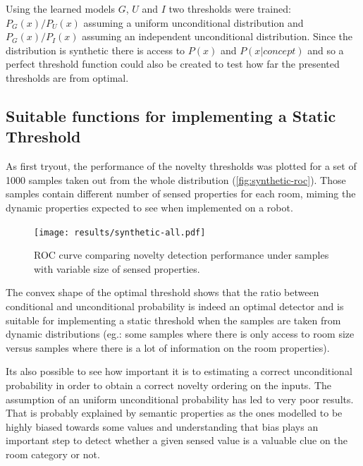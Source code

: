 \documentclass[runningheads,a4paper]{llncs}
\begin{document}
Using the learned models $G$, $U$ and $I$ two thresholds were trained:
$P_G(x)/P_U(x)$ assuming a uniform unconditional distribution
and $P_G(x)/P_I(x)$ assuming an independent unconditional distribution.
Since the distribution is synthetic there is access to $P(x)$ and $P(x|concept)$
and so a perfect threshold function could also be created to test how far the
presented thresholds are from optimal.

\subsection{Suitable functions for implementing a Static Threshold}
As first tryout, the performance of the novelty thresholds was plotted for a set
of 1000 samples taken out from the whole distribution (\autoref{fig:synthetic-roc}).
Those samples contain different number of sensed properties for each room, miming
the dynamic properties expected to see when implemented on a robot.

\begin{figure}[h]
\centering
\texttt{[image: results/synthetic-all.pdf]}

\caption{\label{fig:synthetic-roc}ROC curve comparing novelty detection performance
         under samples with variable size of sensed properties.}
\end{figure}

The convex shape of the optimal threshold shows that the ratio between conditional
and unconditional probability is indeed an optimal detector and is suitable for
implementing a static threshold when the samples are taken from dynamic
distributions (eg.: some samples where there is only access to room size versus
samples where there is a lot of information on the room properties).

Its also possible to see how important it is to estimating a correct unconditional
probability in order to obtain a correct novelty ordering on the inputs.
The assumption of an uniform unconditional probability has led to very poor results.
That is probably explained by semantic properties as the ones modelled to be highly
biased towards some values and understanding that bias plays an important step
to detect whether a given sensed value is a valuable clue on the room category
or not.
\end{document}
